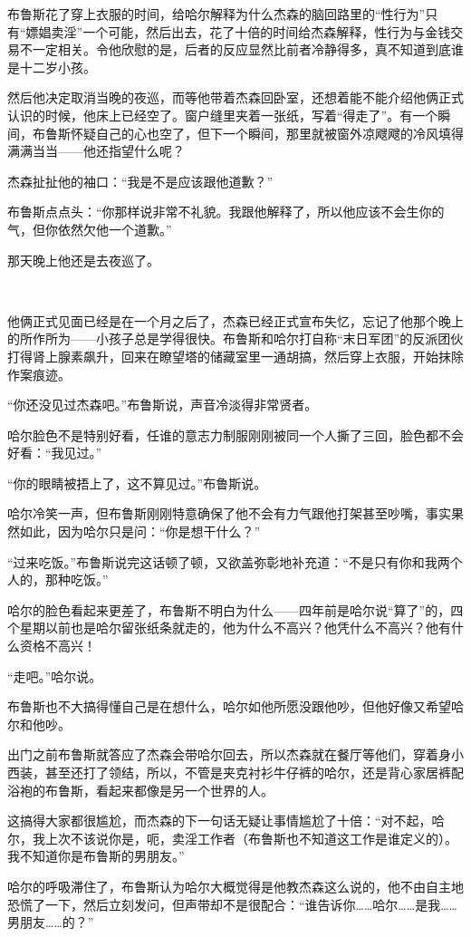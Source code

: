 \documentclass[../main]{subfiles}
\begin{document}
布鲁斯花了穿上衣服的时间，给哈尔解释为什么杰森的脑回路里的“性行为”只有“嫖娼卖淫”一个可能，然后出去，花了十倍的时间给杰森解释，性行为与金钱交易不一定相关。令他欣慰的是，后者的反应显然比前者冷静得多，真不知道到底谁是十二岁小孩。

然后他决定取消当晚的夜巡，而等他带着杰森回卧室，还想着能不能介绍他俩正式认识的时候，他床上已经空了。窗户缝里夹着一张纸，写着“得走了”。有一个瞬间，布鲁斯怀疑自己的心也空了，但下一个瞬间，那里就被窗外凉飕飕的冷风填得满满当当——他还指望什么呢？

杰森扯扯他的袖口：“我是不是应该跟他道歉？”

布鲁斯点点头：“你那样说非常不礼貌。我跟他解释了，所以他应该不会生你的气，但你依然欠他一个道歉。”

那天晚上他还是去夜巡了。

~\

他俩正式见面已经是在一个月之后了，杰森已经正式宣布失忆，忘记了他那个晚上的所作所为——小孩子总是学得很快。布鲁斯和哈尔打自称“末日军团”的反派团伙打得肾上腺素飙升，回来在瞭望塔的储藏室里一通胡搞，然后穿上衣服，开始抹除作案痕迹。

“你还没见过杰森吧。”布鲁斯说，声音冷淡得非常贤者。

哈尔脸色不是特别好看，任谁的意志力制服刚刚被同一个人撕了三回，脸色都不会好看：“我见过。”

“你的眼睛被捂上了，这不算见过。”布鲁斯说。

哈尔冷笑一声，但布鲁斯刚刚特意确保了他不会有力气跟他打架甚至吵嘴，事实果然如此，因为哈尔只是问：“你是想干什么？”

“过来吃饭。”布鲁斯说完这话顿了顿，又欲盖弥彰地补充道：“不是只有你和我两个人的，那种吃饭。”

哈尔的脸色看起来更差了，布鲁斯不明白为什么——四年前是哈尔说“算了”的，四个星期以前也是哈尔留张纸条就走的，他为什么不高兴？他凭什么不高兴？他有什么资格不高兴！

“走吧。”哈尔说。

布鲁斯也不大搞得懂自己是在想什么，哈尔如他所愿没跟他吵，但他好像又希望哈尔和他吵。

出门之前布鲁斯就答应了杰森会带哈尔回去，所以杰森就在餐厅等他们，穿着身小西装，甚至还打了领结，所以，不管是夹克衬衫牛仔裤的哈尔，还是背心家居裤配浴袍的布鲁斯，看起来都像是另一个世界的人。

这搞得大家都很尴尬，而杰森的下一句话无疑让事情尴尬了十倍：“对不起，哈尔，我上次不该说你是，呃，卖淫工作者（布鲁斯也不知道这工作是谁定义的）。我不知道你是布鲁斯的男朋友。”

哈尔的呼吸滞住了，布鲁斯认为哈尔大概觉得是他教杰森这么说的，他不由自主地恐慌了一下，然后立刻发问，但声带却不是很配合：“谁告诉你……哈尔……是我……男朋友……的？”
\end{document}
